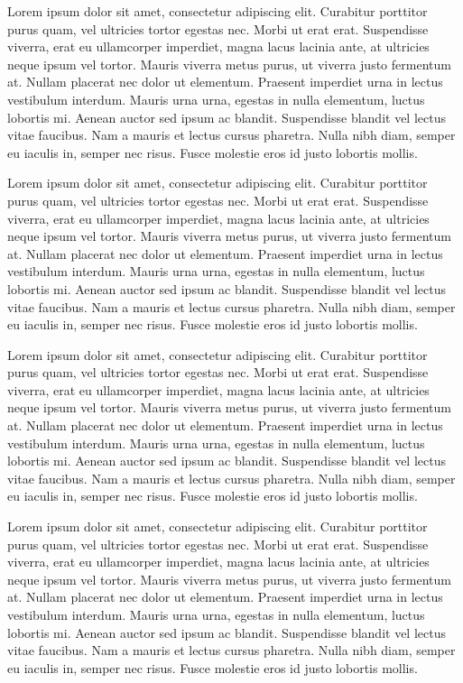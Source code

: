 \documentclass[12pt, firstpage]{article}
\begin{document}
Lorem ipsum dolor sit amet, consectetur adipiscing elit. Curabitur porttitor purus quam, vel ultricies tortor egestas nec. Morbi ut erat erat. Suspendisse viverra, erat eu ullamcorper imperdiet, magna lacus lacinia ante, at ultricies neque ipsum vel tortor. Mauris viverra metus purus, ut viverra justo fermentum at. Nullam placerat nec dolor ut elementum. Praesent imperdiet urna in lectus vestibulum interdum. Mauris urna urna, egestas in nulla elementum, luctus lobortis mi. Aenean auctor sed ipsum ac blandit. Suspendisse blandit vel lectus vitae faucibus. Nam a mauris et lectus cursus pharetra. Nulla nibh diam, semper eu iaculis in, semper nec risus. Fusce molestie eros id justo lobortis mollis.

Lorem ipsum dolor sit amet, consectetur adipiscing elit. Curabitur porttitor purus quam, vel ultricies tortor egestas nec. Morbi ut erat erat. Suspendisse viverra, erat eu ullamcorper imperdiet, magna lacus lacinia ante, at ultricies neque ipsum vel tortor. Mauris viverra metus purus, ut viverra justo fermentum at. Nullam placerat nec dolor ut elementum. Praesent imperdiet urna in lectus vestibulum interdum. Mauris urna urna, egestas in nulla elementum, luctus lobortis mi. Aenean auctor sed ipsum ac blandit. Suspendisse blandit vel lectus vitae faucibus. Nam a mauris et lectus cursus pharetra. Nulla nibh diam, semper eu iaculis in, semper nec risus. Fusce molestie eros id justo lobortis mollis.

Lorem ipsum dolor sit amet, consectetur adipiscing elit. Curabitur porttitor purus quam, vel ultricies tortor egestas nec. Morbi ut erat erat. Suspendisse viverra, erat eu ullamcorper imperdiet, magna lacus lacinia ante, at ultricies neque ipsum vel tortor. Mauris viverra metus purus, ut viverra justo fermentum at. Nullam placerat nec dolor ut elementum. Praesent imperdiet urna in lectus vestibulum interdum. Mauris urna urna, egestas in nulla elementum, luctus lobortis mi. Aenean auctor sed ipsum ac blandit. Suspendisse blandit vel lectus vitae faucibus. Nam a mauris et lectus cursus pharetra. Nulla nibh diam, semper eu iaculis in, semper nec risus. Fusce molestie eros id justo lobortis mollis.

Lorem ipsum dolor sit amet, consectetur adipiscing elit. Curabitur porttitor purus quam, vel ultricies tortor egestas nec. Morbi ut erat erat. Suspendisse viverra, erat eu ullamcorper imperdiet, magna lacus lacinia ante, at ultricies neque ipsum vel tortor. Mauris viverra metus purus, ut viverra justo fermentum at. Nullam placerat nec dolor ut elementum. Praesent imperdiet urna in lectus vestibulum interdum. Mauris urna urna, egestas in nulla elementum, luctus lobortis mi. Aenean auctor sed ipsum ac blandit. Suspendisse blandit vel lectus vitae faucibus. Nam a mauris et lectus cursus pharetra. Nulla nibh diam, semper eu iaculis in, semper nec risus. Fusce molestie eros id justo lobortis mollis.
\end{document}
